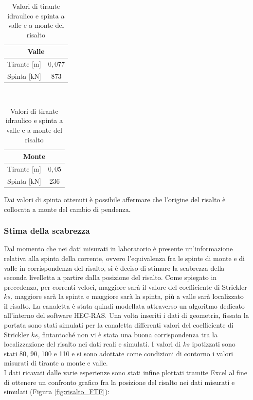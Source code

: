 \documentclass[12pt]{article} %
\begin{document}
\begin{table}[H]
\begin{minipage}[b]{8cm}
    \raggedleft
    \begin{tabular}{cc}
    \hline
    \multicolumn{2}{c}{\textbf{Valle}}\\
        \hline
        Tirante [m] & $0,077$ \\
        Spinta [kN] & $873$\\
        \hline
    \end{tabular}
\end{minipage}
\ \hspace{1.5cm}  \
\begin{minipage}[b]{8cm}
    \raggedright
    \begin{tabular}{cc}
    \hline
    \multicolumn{2}{c}{\textbf{Monte}}\\
        \hline
        Tirante [m] & $0,05$ \\
        Spinta [kN] & $236$ \\
        \hline
    \end{tabular}
\end{minipage}
\caption{Valori di tirante idraulico e spinta a valle e a monte del risalto}
\end{table}

\noindent Dai valori di spinta ottenuti è possibile affermare che l'origine del risalto è collocata a monte del cambio di pendenza.


\subsubsection{Stima della scabrezza}

\noindent Dal momento che nei dati misurati in laboratorio è presente un'informazione relativa alla spinta della corrente, ovvero l'equivalenza fra le spinte di monte e di valle in corrispondenza del risalto, si è deciso di stimare la scabrezza della seconda livelletta a partire dalla posizione del risalto. Come spiegato in precedenza, per correnti veloci, maggiore sarà il valore del coefficiente di Strickler $ks$, maggiore sarà la spinta e maggiore sarà la spinta, più a valle sarà localizzato il risalto.
La canaletta è stata quindi modellata attraverso un algoritmo dedicato all'interno del software HEC-RAS. 
Una volta inseriti i dati di geometria, fissata la portata sono stati simulati per la canaletta differenti valori del coefficiente di Strickler $ks$, fintantoché non vi è stata una buona corrispondenza tra la localizzazione del risalto nei dati reali e simulati.
I valori di $ks$ ipotizzati sono stati 80, 90, 100 e 110 e si sono adottate come condizioni di contorno i valori misurati di tirante a monte e valle.\\
I dati ricavati dalle varie esperienze sono stati infine plottati tramite Excel al fine di ottenere un confronto grafico fra la posizione del risalto nei dati misurati e simulati (Figura \ref{fig:risalto_FTF}):
\end{document}
